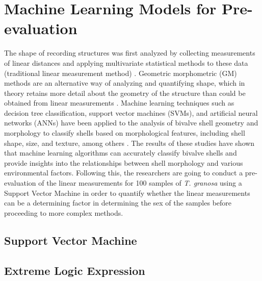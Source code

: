 \section{Machine Learning Models for Pre-evaluation }
\label{sec:ml models}

The shape of recording structures was first analyzed by collecting measurements of linear distances and applying multivariate statistical methods to these data (traditional linear measurement method) \cite{rohlf1984}. Geometric morphometric (GM) methods are an alternative way of analyzing and quantifying shape, which in theory retains more detail about the geometry of the structure than could be obtained from linear measurements \cite{adams2004}. Machine learning techniques such as decision tree classification, support vector machines (SVMs), and artificial neural networks (ANNs) have been applied to the analysis of bivalve shell geometry and morphology to classify shells based on morphological features, including shell shape, size, and texture, among others \cite{kiel2021}. The results of these studies have shown that machine learning algorithms can accurately classify bivalve shells and provide insights into the relationships between shell morphology and various environmental factors.
Following this, the researchers are going to conduct a pre-evaluation of the linear measurements for 100 samples of \textit{T. granosa} using a Support Vector Machine in order to quantify whether the linear measurements can be a determining factor in determining the sex of the samples before proceeding to more complex methods. 

\subsection{Support Vector Machine}
\subsection{Extreme Logic Expression}

